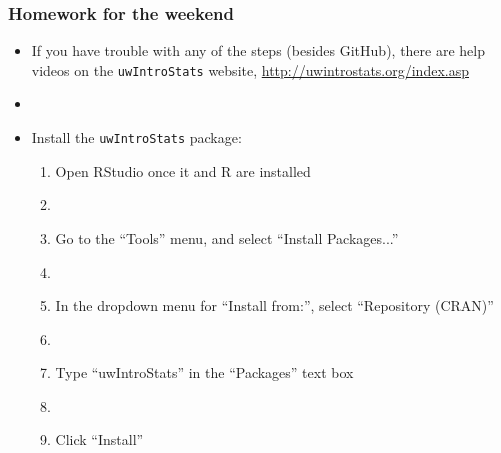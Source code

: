 \documentclass[12pt]{beamer}
\newcommand{\myframe}[1]{\begin{frame} \frametitle{#1}}
\begin{document}
\myframe{Homework for the weekend}
\begin{itemize}
\item If you have trouble with any of the steps (besides GitHub), there are help videos on the \texttt{uwIntroStats} website, \url{http://uwintrostats.org/index.asp}
\item[]
\item Install the \texttt{uwIntroStats} package:
\begin{enumerate}
\item Open RStudio once it and R are installed
\item[]
\item Go to the ``Tools'' menu, and select ``Install Packages...''
\item[]
\item In the dropdown menu for ``Install from:'', select ``Repository (CRAN)''
\item[]
\item Type ``uwIntroStats'' in the ``Packages'' text box
\item[]
\item Click ``Install'' 
\end{enumerate}
\end{itemize}
\end{frame}
\end{document}

